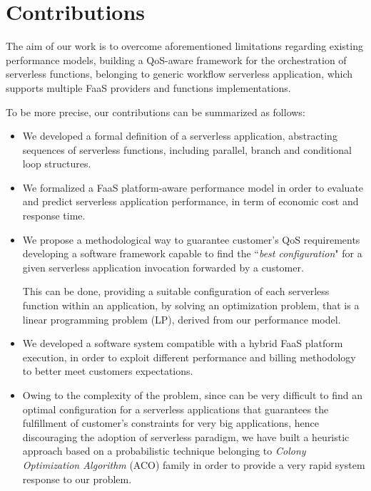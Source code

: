 \documentclass[12pt,a4paper]{report}
\newcommand{\ItalicQuotMark}[1]{``\textit{#1}"}
\begin{document}
\section{Contributions}

The aim of our work is to overcome aforementioned limitations regarding existing performance models, building a QoS-aware framework for the orchestration of serverless functions, belonging to generic workflow serverless application, which supports multiple FaaS providers and functions implementations.

To be more precise, our contributions can be summarized as follows:

\begin{itemize}
	\item We developed a formal definition of a serverless application, abstracting sequences of serverless functions, including parallel, branch and conditional loop structures.
	
	\item We formalized a FaaS platform-aware performance model in order to evaluate and predict serverless application performance, in term of economic cost and response time.
		
	\item We propose a methodological way to guarantee customer's QoS requirements developing a software framework capable to find the \ItalicQuotMark{best configuration} for a given serverless application invocation forwarded by a customer.
		
	This can be done, providing a suitable configuration of each serverless function within an application, by solving an optimization problem, that is a linear programming problem (LP), derived from our performance model.
	
	\item We developed a software system compatible with a hybrid FaaS platform execution, in order to exploit different performance and billing methodology to better meet customers expectations.
	

	\item Owing to the complexity of the problem, since can be very difficult to find an optimal configuration for a serverless applications that guarantees the fulfillment of customer's constraints for very big applications, hence discouraging the adoption of serverless paradigm, we have built a heuristic approach based on a probabilistic technique belonging to \textit{Colony Optimization Algorithm} (ACO) family in order to provide a very rapid system response to our problem.
	

\end{itemize}
\end{document}
